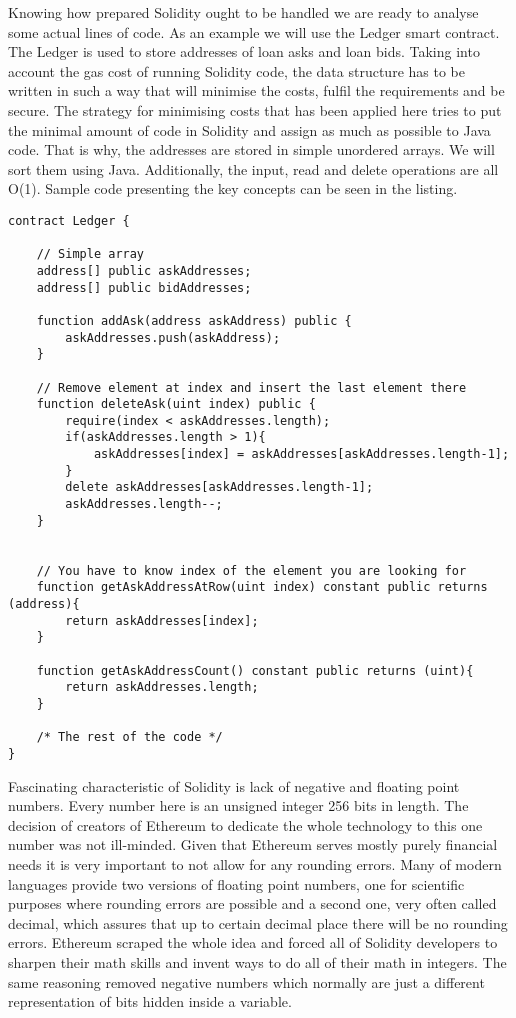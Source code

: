 \documentclass[a4paper,12pt,twoside,openany]{report}
\begin{document}
Knowing how prepared Solidity ought to be handled we are ready to analyse some actual lines of code.
As an example we will use the Ledger smart contract. The Ledger is used to store addresses of loan asks and loan bids. Taking into account the gas cost of running Solidity code, the data structure has to be written in such a way that will minimise the costs, fulfil the requirements and be secure. The strategy for minimising costs that has been applied here tries to put the minimal amount of code in Solidity and assign as much as possible to Java code. That is why, the addresses are stored in simple unordered arrays. We will sort them using Java. Additionally, the input, read and delete operations are all O(1). Sample code presenting the key concepts can be seen in the listing.
\newpage
\begin{lstlisting}
contract Ledger {

 	// Simple array
	address[] public askAddresses;
	address[] public bidAddresses;

	function addAsk(address askAddress) public {
		askAddresses.push(askAddress);
	}

	// Remove element at index and insert the last element there
	function deleteAsk(uint index) public {
		require(index < askAddresses.length);
		if(askAddresses.length > 1){
			askAddresses[index] = askAddresses[askAddresses.length-1];
		}
		delete askAddresses[askAddresses.length-1];
		askAddresses.length--;
	}


	// You have to know index of the element you are looking for
	function getAskAddressAtRow(uint index) constant public returns (address){
		return askAddresses[index];
	}

	function getAskAddressCount() constant public returns (uint){
		return askAddresses.length;
	}

	/* The rest of the code */
}
\end{lstlisting}
 
Fascinating characteristic of Solidity is lack of negative and floating point numbers. Every number here is an unsigned integer 256 bits in length. The decision of creators of Ethereum to dedicate the whole technology to this one number was not ill-minded. Given that Ethereum serves mostly purely financial needs it is very important to not allow for any rounding errors. Many of modern languages provide two versions of floating point numbers, one for scientific purposes where rounding errors are possible and a second one, very often called decimal, which assures that up to certain decimal place there will be no rounding errors. Ethereum scraped the whole idea and forced all of Solidity developers to sharpen their math skills and invent ways to do all of their math in integers. The same reasoning removed negative numbers which normally are just a different representation of bits hidden inside a variable.
\end{document}
